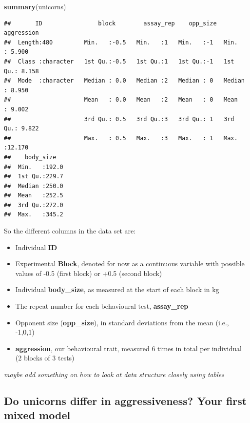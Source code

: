 \documentclass[
  12pt,
]{book}
\newenvironment{Shaded}{\begin{snugshade}}{\end{snugshade}}
\newcommand{\KeywordTok}[1]{\textcolor[rgb]{0.13,0.29,0.53}{\textbf{#1}}}
\newcommand{\NormalTok}[1]{#1}
\providecommand{\tightlist}{%
  \setlength{\itemsep}{0pt}\setlength{\parskip}{0pt}}
\begin{document}
\begin{Shaded}
\begin{Highlighting}[]
\KeywordTok{summary}\NormalTok{(unicorns)}
\end{Highlighting}
\end{Shaded}

\begin{verbatim}
##       ID                block        assay_rep    opp_size    aggression    
##  Length:480         Min.   :-0.5   Min.   :1   Min.   :-1   Min.   : 5.900  
##  Class :character   1st Qu.:-0.5   1st Qu.:1   1st Qu.:-1   1st Qu.: 8.158  
##  Mode  :character   Median : 0.0   Median :2   Median : 0   Median : 8.950  
##                     Mean   : 0.0   Mean   :2   Mean   : 0   Mean   : 9.002  
##                     3rd Qu.: 0.5   3rd Qu.:3   3rd Qu.: 1   3rd Qu.: 9.822  
##                     Max.   : 0.5   Max.   :3   Max.   : 1   Max.   :12.170  
##    body_size    
##  Min.   :192.0  
##  1st Qu.:229.7  
##  Median :250.0  
##  Mean   :252.5  
##  3rd Qu.:272.0  
##  Max.   :345.2
\end{verbatim}

So the different columns in the data set are:

\begin{itemize}
\tightlist
\item
  Individual \textbf{ID}
\item
  Experimental \textbf{Block}, denoted for now as a continuous variable with possible values of -0.5 (first block) or +0.5 (second block)
\item
  Individual \textbf{body\_size}, as measured at the start of each block in kg
\item
  The repeat number for each behavioural test, \textbf{assay\_rep}
\item
  Opponent size (\textbf{opp\_size}), in standard deviations from the mean (i.e., -1,0,1)
\item
  \textbf{aggression}, our behavioural trait, measured 6 times in total per individual (2 blocks of 3 tests)
\end{itemize}

\emph{maybe add something on how to look at data structure closely using tables}

\hypertarget{do-unicorns-differ-in-aggressiveness-your-first-mixed-model}{%
\subsection{Do unicorns differ in aggressiveness? Your first mixed model}\label{do-unicorns-differ-in-aggressiveness-your-first-mixed-model}}
\end{document}
